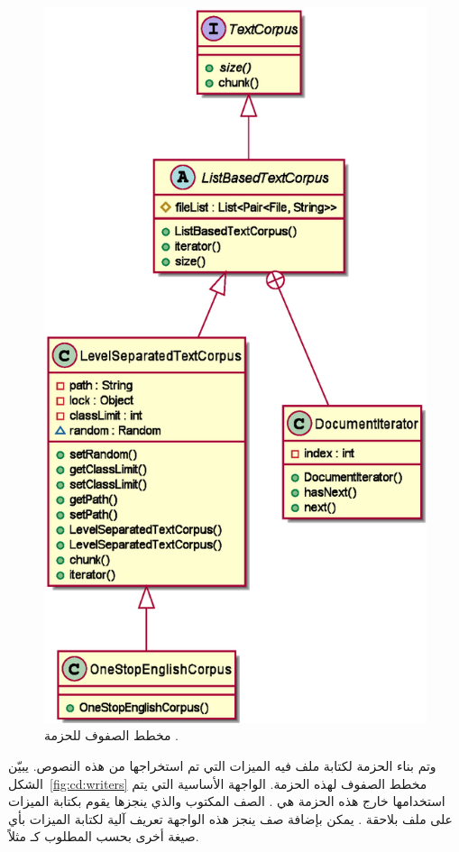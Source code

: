 \begin{figure}[htb]
	\centering
	\includegraphics[width=0.6\linewidth]{images/cd-corpora.eps}
	\caption{%
		مخطط الصفوف للحزمة .
	}
	\label{fig:cd:corpora}
\end{figure}

وتم بناء الحزمة  لكتابة ملف فيه الميزات التي تم استخراجها من هذه النصوص.
يبيّن الشكل~\ref{fig:cd:writers} مخطط الصفوف لهذه الحزمة.
الواجهة الأساسية التي يتم استخدامها خارج هذه الحزمة هي .
الصف المكتوب والذي ينجزها يقوم بكتابة الميزات على ملف بلاحقة .
يمكن بإضافة صف ينجز هذه الواجهة تعريف آلية لكتابة الميزات بأي صيغة أخرى بحسب المطلوب كـ  مثلاً.

